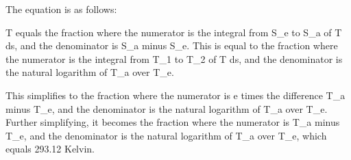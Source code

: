 The equation is as follows:

T equals the fraction where the numerator is the integral from S_e to S_a of T ds, and the denominator is S_a minus S_e. This is equal to the fraction where the numerator is the integral from T_1 to T_2 of T ds, and the denominator is the natural logarithm of T_a over T_e.

This simplifies to the fraction where the numerator is e times the difference T_a minus T_e, and the denominator is the natural logarithm of T_a over T_e. Further simplifying, it becomes the fraction where the numerator is T_a minus T_e, and the denominator is the natural logarithm of T_a over T_e, which equals 293.12 Kelvin.